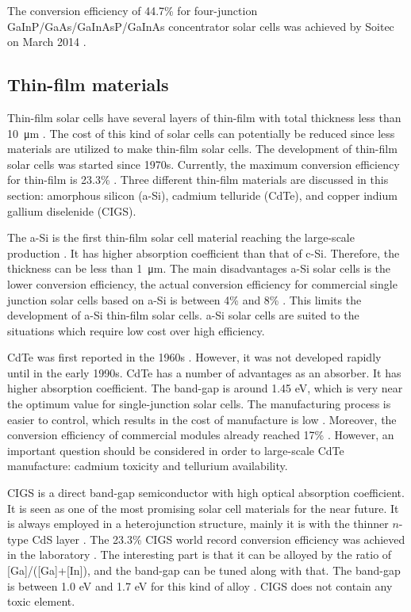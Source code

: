 \documentclass[a4paper, 12pt, titlepage,oneside,drop]{kthesis}
\begin{document}
The conversion efficiency of 44.7\% for four-junction GaInP/GaAs/GaInAsP/GaInAs concentrator solar cells was achieved by Soitec on March 2014 \cite{dimroth2014wafer}.

\subsection{Thin-film materials}

Thin-film solar cells have several layers of thin-film with total thickness less than \SI{10} {\micro\meter} \cite{maissel1995handbook}. The cost of this kind of solar cells can potentially be reduced since less materials are utilized to make thin-film solar cells. The development of thin-film
solar cells was started since 1970s. Currently, the maximum conversion efficiency for thin-film is 23.3\% \cite{ward2014cu}. Three different thin-film
materials are discussed in this section: amorphous silicon (a-Si), cadmium telluride (CdTe), and copper indium gallium diselenide (CIGS).

The a-Si is the first thin-film solar cell material reaching the large-scale production \cite{carlson1976amorphous, street2000technology, schropp1998amorphous}. It has higher absorption coefficient than that of c-Si. Therefore, the thickness can be less than \SI{1} {\micro\meter}. The 
main disadvantages a-Si solar cells is the lower conversion efficiency, the actual conversion efficiency for commercial single junction solar cells based on a-Si is between 4\% and 8\% \cite{irena}. This limits the development of a-Si thin-film solar cells.
a-Si solar cells are suited to the situations which require low cost over high efficiency. 

CdTe was first reported in the 1960s \cite{wolden2011photovoltaic}. However, it was not developed rapidly until in the early 1990s. CdTe has a number of advantages as an absorber. It has higher absorption coefficient. The band-gap is around 1.45 eV, which 
is very near the optimum value for single-junction solar cells. The manufacturing process is easier to control, which results in the cost of manufacture is low \cite{meyers1988design}. Moreover, the conversion efficiency of 
commercial modules already reached 17\% \cite{firstsolarcdte}.
However, an important question should be considered in order to large-scale CdTe manufacture: cadmium toxicity and tellurium availability. 

CIGS is a direct band-gap semiconductor with high optical absorption coefficient. It is seen as one of the most promising solar cell materials for the near future. It is always employed in a heterojunction structure, mainly it is with the thinner
$n$-type CdS layer \cite{green2007thin}. The 23.3\% CIGS world record conversion efficiency was achieved in the laboratory \cite{ward2014cu}. The interesting part is that it can be alloyed by the ratio of [Ga]/([Ga]+[In]), and the band-gap can be tuned along with that. The band-gap 
is between 1.0 eV and 1.7 eV for this kind of alloy \cite{kumar2013cation, chen2012band, chen2011parameterization, persson2009impurity, green2006third}. CIGS does not contain any toxic element.
\end{document}
